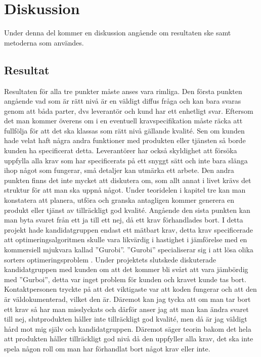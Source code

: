 \section{Diskussion}
Under denna del kommer en diskussion angående om resultaten ske samt metoderna som användes.
\subsection{Resultat}
Resultaten för alla tre punkter måste anses vara rimliga. Den första punkten angående vad som är rätt nivå är en väldigt diffus fråga och kan bara svaras genom att båda parter, dvs leverantör och kund har ett enhetligt svar. Eftersom det man kommer överens om i en eventuell kravspecifikation måste räcka att fullfölja för att det ska klassas som rätt nivå gällande kvalité. Sen om kunden hade velat haft några andra funktioner med produkten eller tjänsten så borde kunden ha specificerat detta. Leverantörer har också skyldighet att försöka uppfylla alla krav som har specificerats på ett snyggt sätt och inte bara slänga ihop något som fungerar, små detaljer kan utmärka ett arbete.
\newline
\newline
Den andra punkten finns det inte mycket att diskutera om, som allt annat i livet krävs det struktur för att man ska uppnå något. Under teoridelen i kapitel tre kan man konstatera att planera, utföra och granska antagligen kommer generera en produkt eller tjänst av tillräckligt god kvalité.
\newline
\newline
Angående den sista punkten kan man byta svaret från ett ja till ett nej, då ett krav förhandlades bort. I detta projekt hade kandidatgruppen endast ett mätbart krav, detta krav specificerade att optimeringsalgoritmen skulle vara likvärdig i hastighet i jämförelse med en kommersiell mjukvara kallad ''Gurobi''. ''Gurobi'' specialiserar sig i att lösa olika sorters optimeringsproblem \citep{gurobi}. Under projektets slutskede diskuterade kandidatgruppen med kunden om att det kommer bli svårt att vara jämbördig med ''Gurboi'', detta var inget problem för kunden och kravet kunde tas bort. Kontaktpersonen tryckte på att det viktigaste var att koden fungerar och att den är väldokumenterad, vilket den är. Däremot kan jag tycka att om man tar bort ett krav så har man misslyckats och därför anser jag att man kan ändra svaret till nej, slutprodukten håller inte tillräckligt god kvalité, men då är jag väldigt hård mot mig själv och kandidatgruppen. Däremot säger teorin bakom det hela att produkten håller tillräckligt god nivå då den uppfyller alla krav, det ska inte spela någon roll om man har förhandlat bort något krav eller inte.

